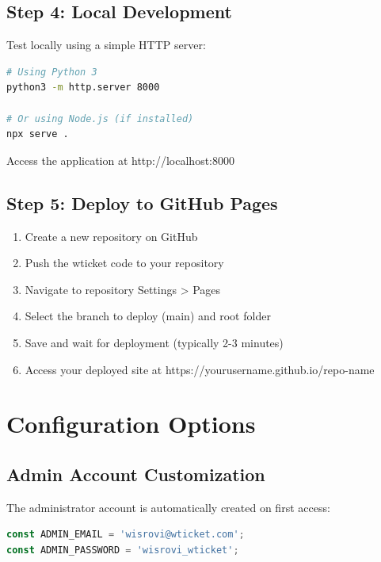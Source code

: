 \documentclass[12pt,a4paper]{report}
\begin{document}
\subsection{Step 4: Local Development}
\label{sub:step4}

Test locally using a simple HTTP server:

\begin{lstlisting}[language=bash, caption={Start Local Server}, label={lst:server}]
# Using Python 3
python3 -m http.server 8000

# Or using Node.js (if installed)
npx serve .
\end{lstlisting}

Access the application at http://localhost:8000

\subsection{Step 5: Deploy to GitHub Pages}
\label{sub:step5}

\begin{enumerate}
    \item Create a new repository on GitHub
    \item Push the wticket code to your repository
    \item Navigate to repository Settings > Pages
    \item Select the branch to deploy (main) and root folder
    \item Save and wait for deployment (typically 2-3 minutes)
    \item Access your deployed site at https://yourusername.github.io/repo-name
\end{enumerate}

\section{Configuration Options}
\label{sec:config-options}

\subsection{Admin Account Customization}
\label{sub:admin-custom}

The administrator account is automatically created on first access:

\begin{lstlisting}[language=JavaScript, caption={Admin Account Settings}, label={lst:admin}]
const ADMIN_EMAIL = 'wisrovi@wticket.com';
const ADMIN_PASSWORD = 'wisrovi_wticket';
\end{lstlisting}
\end{document}
